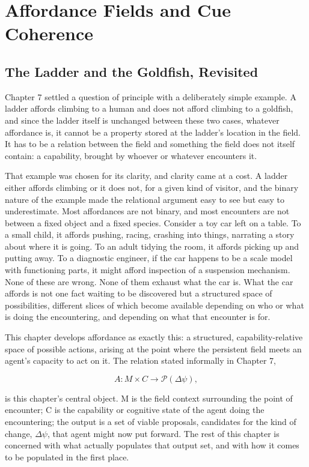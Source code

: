 \chapter{Affordance Fields and Cue Coherence}

\section{The Ladder and the Goldfish, Revisited}

Chapter 7 settled a question of principle with a deliberately simple example. A ladder affords climbing to a human and does not afford climbing to a goldfish, and since the ladder itself is unchanged between these two cases, whatever affordance is, it cannot be a property stored at the ladder's location in the field. It has to be a relation between the field and something the field does not itself contain: a capability, brought by whoever or whatever encounters it.

That example was chosen for its clarity, and clarity came at a cost. A ladder either affords climbing or it does not, for a given kind of visitor, and the binary nature of the example made the relational argument easy to see but easy to underestimate. Most affordances are not binary, and most encounters are not between a fixed object and a fixed species. Consider a toy car left on a table. To a small child, it affords pushing, racing, crashing into things, narrating a story about where it is going. To an adult tidying the room, it affords picking up and putting away. To a diagnostic engineer, if the car happens to be a scale model with functioning parts, it might afford inspection of a suspension mechanism. None of these are wrong. None of them exhaust what the car is. What the car affords is not one fact waiting to be discovered but a structured space of possibilities, different slices of which become available depending on who or what is doing the encountering, and depending on what that encounter is for.

This chapter develops affordance as exactly this: a structured, capability-relative space of possible actions, arising at the point where the persistent field meets an agent's capacity to act on it. The relation stated informally in Chapter 7,

\[ A : M \times C \to \mathcal{P}(\Delta\psi), \]

is this chapter's central object. M is the field context surrounding the point of encounter; C is the capability or cognitive state of the agent doing the encountering; the output is a set of viable proposals, candidates for the kind of change, \(\Delta\psi\), that agent might now put forward. The rest of this chapter is concerned with what actually populates that output set, and with how it comes to be populated in the first place.

